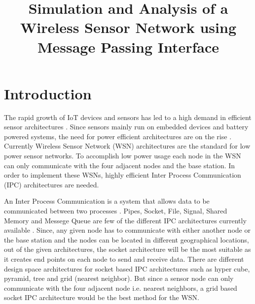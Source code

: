 \documentclass[conference]{IEEEtran}
\begin{document}
	
	\title{Simulation and Analysis of a Wireless Sensor Network using Message Passing Interface }
	
	\author{
		}
	\maketitle
	
	\begin{abstract}
		
	\end{abstract}

	
	\begin{IEEEkeywords}
	
	\end{IEEEkeywords}
	
	\section{Introduction}
	
	The rapid growth of IoT devices and sensors has led to a high demand in efficient sensor architectures \cite{othman2012wireless}. Since sensors mainly run on embedded devices and battery powered systems, the need for power efficient architectures are on the rise \cite{guy2006wireless}. Currently Wireless Sensor Network (WSN) architectures are the standard for low power sensor networks. To accomplish low power usage each node in the WSN can only communicate with the four adjacent nodes and the base station. In order to implement these WSNs, highly efficient Inter Process Communication (IPC) architectures are needed.
	
	An Inter Process Communication is a system that allows data to be communicated between two processes \cite{techopedia.com}. Pipes, Socket, File, Signal, Shared Memory and Messege Queue are few of the different IPC architectures currently available \cite{onsman_2018}. Since, any given node has to communicate with either another node or the base station and the nodes can be located in different geographical locations, out of the given architectures, the socket architecture will be the most suitable as it creates end points on each node to send and receive data. There are different design space architectures for socket based IPC architectures such as hyper cube, pyramid, tree and grid (nearest neighbor). But since a sensor node can only communicate with the four adjacent node i.e. nearest neighbors, a grid based socket IPC architecture would be the best method for the WSN. 
	
\end{document}
